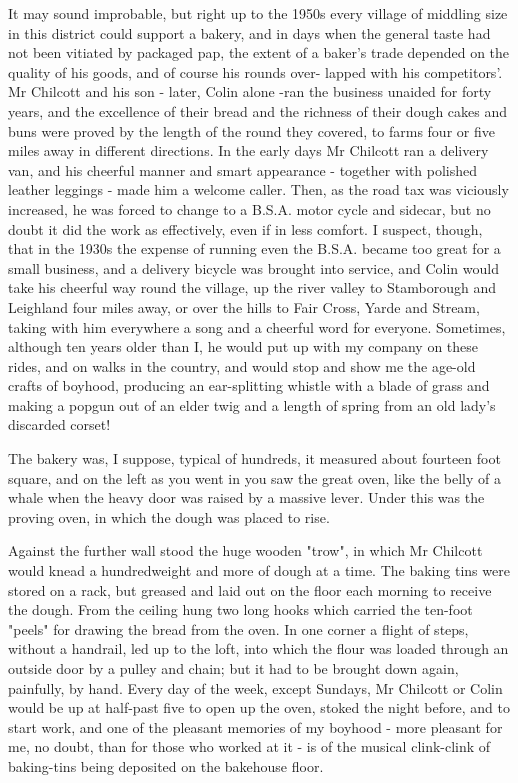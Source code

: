 It may sound improbable, but right up to the 1950s every village of middling size in this district could support a bakery, and in days when the general taste had not been vitiated by packaged pap, the extent of a baker's trade depended on the quality of his goods, and of course his rounds over- lapped with his competitors'. Mr Chilcott and his son - later, Colin alone -ran the business unaided for forty years, and the excellence of their bread and the richness of their dough cakes and buns were proved by the length of the round they covered, to farms four or five miles away in different directions. In the early days Mr Chilcott ran a delivery van, and his cheerful manner and smart appearance - together with polished leather leggings - made him a welcome caller. Then, as the road tax was viciously increased, he was forced to change to a B.S.A. motor cycle and sidecar, but no doubt it did the work as effectively, even if in less comfort. I suspect, though, that in the 1930s the expense of running even the B.S.A. became too great for a small business, and a delivery bicycle was brought into service, and Colin would take his cheerful way round the village, up the river valley to Stamborough and Leighland four miles away, or over the hills to Fair Cross, Yarde and Stream, taking with him everywhere a song and a cheerful word for everyone. Sometimes, although ten years older than I, he would put up with my company on these rides, and on walks in the country, and would stop and show me the age-old crafts of boyhood, producing an ear-splitting whistle with a blade of grass and making a popgun out of an elder twig and a length of spring from an old lady's discarded corset!

The bakery was, I suppose, typical of hundreds, it measured about fourteen foot square, and on the left as you went in you saw the great oven, like the belly of a whale when the heavy door was raised by a massive lever. Under this was the proving oven, in which the dough was placed to rise.

Against the further wall stood the huge wooden "trow", in which Mr Chilcott would knead a hundredweight and more of dough at a time. The baking tins were stored on a rack, but greased and laid out on the floor each morning to receive the dough. From the ceiling hung two long hooks which carried the ten-foot "peels" for drawing the bread from the oven. In one corner a flight of steps, without a handrail, led up to the loft, into which the flour was loaded through an outside door by a pulley and chain; but it had to be brought down again, painfully, by hand. Every day of the week, except Sundays, Mr Chilcott or Colin would be up at half-past five to open up the oven, stoked the night before, and to start work, and one of the pleasant memories of my boyhood - more pleasant for me, no doubt, than for those who worked at it - is of the musical clink-clink of baking-tins being deposited on the bakehouse floor.

